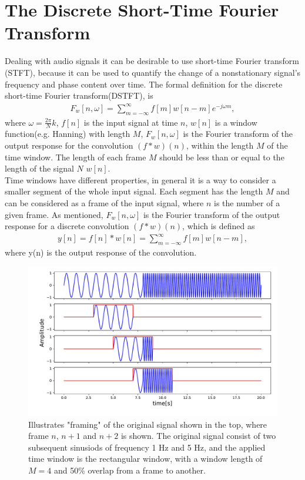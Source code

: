 \section{The Discrete Short-Time Fourier Transform}
Dealing with audio signals it can be desirable to use short-time Fourier transform (STFT), because it can be used to quantify the change of a nonstationary signal's frequency and phase content over time. The formal definition for the discrete short-time Fourier transform(DSTFT), is 
\begin{align*}
    F_w[n,\omega]=\sum^{\infty}_{m=-\infty}f[m]w[n-m]e^{-j\omega m},
\end{align*}
where $\omega=\frac{2\pi}{N} k$, $f[n]$ is the input signal at time $n$, $w[n]$ is a window function(e.g. Hanning) with length $M$, $F_w[n,\omega]$ is the Fourier transform of the output response for the convolution $(f*w)(n)$, within the length $M$ of the time window. The length of each frame $M$ should be less than or equal to the length of the signal $N$ $w[n]$\cite[56]{layer2015signal}. 
\\
Time windows have different properties, in general it is a way to consider a smaller segment of the whole input signal. Each segment has the length $M$ and can be considered as a frame of the input signal, where $n$ is the number of a given frame.
As mentioned, $F_w[n,\omega]$ is the Fourier transform of the output response for a discrete convolution $(f*w)(n)$, which is defined as
\begin{align*}
    y[n]=f[n]*w[n]=\sum_{m=-\infty}^{\infty}f[m]w[n-m],
\end{align*}
where y(n) is the output response of the convolution.

\begin{figure}
    \centering
    \includegraphics[width=\textwidth]{figures/overlapfigure.pdf}
    \caption{Illustrates "framing" of the original signal shown in the top, where frame $n$, $n+1$ and $n+2$ is shown. The original signal consist of two subsequent sinusiods of frequency 1 Hz and 5 Hz, and the applied time window is the rectangular window, with a window length of $M=4$ and 50\% overlap from a frame to another. }
    \label{fig:overlap}
\end{figure}

